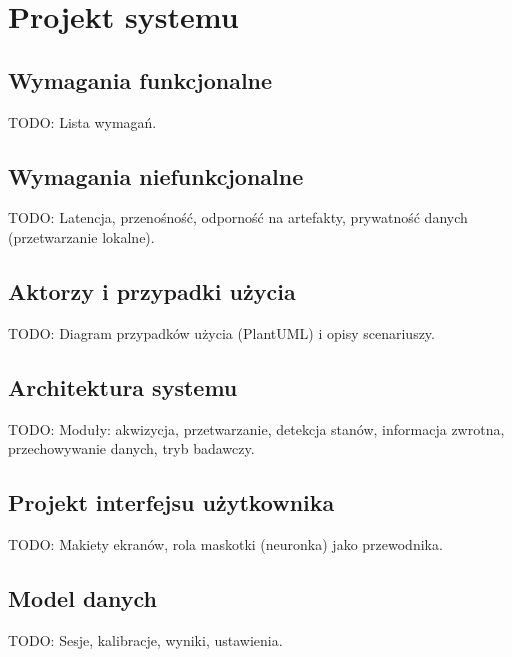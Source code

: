 \chapter{Projekt systemu}
\label{chapt:Projekt}

\section{Wymagania funkcjonalne}
TODO: Lista wymagań.

\section{Wymagania niefunkcjonalne}
TODO: Latencja, przenośność, odporność na artefakty, prywatność danych (przetwarzanie lokalne).

\section{Aktorzy i przypadki użycia}
TODO: Diagram przypadków użycia (PlantUML) i opisy scenariuszy.

\section{Architektura systemu}
TODO: Moduły: akwizycja, przetwarzanie, detekcja stanów, informacja zwrotna, przechowywanie danych, tryb badawczy.

\section{Projekt interfejsu użytkownika}
TODO: Makiety ekranów, rola maskotki (neuronka) jako przewodnika.

\section{Model danych}
TODO: Sesje, kalibracje, wyniki, ustawienia.
